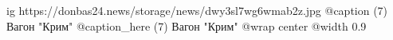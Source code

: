  
 
 
 
 

\ifcmt
  ig https://donbas24.news/storage/news/dwy3sl7wg6wmab2z.jpg
	@caption (7) Вагон "Крим"
	@caption_here (7) Вагон "Крим"
  @wrap center
  @width 0.9
\fi
